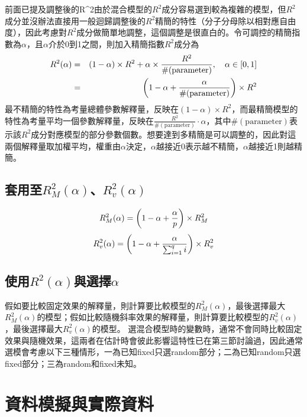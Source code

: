 前面已提及調整後的R^2由於混合模型的$R^2$成分容易選到較為複雜的模型，但$R^2$成分並沒辦法直接用一般迴歸調整後的$R^2$精簡的特性（分子分母除以相對應自由度），因此考慮對$R^2$成分做簡單地調整，這個調整是很直白的。令可調控的精簡指數為$\alpha$，且$\alpha$介於0到1之間，則加入精簡指數$R^2$成分為
\begin{eqnarray}\label{eq:r2alpha}
R^2(\alpha) &=& (1-\alpha)\times R^2+\alpha\times\frac{R^2}{\#(\text{parameter})}, \quad\alpha\in[0, 1] \\
            &=& \left(1-\alpha+\frac{\alpha}{\#(\text{parameter})}\right)\times R^2 \nonumber 
\end{eqnarray}
最不精簡的特性為考量總體參數解釋量，反映在$(1-\alpha)\times R^2$，而最精簡模型的特性為考量平均一個參數解釋量，反映在$\frac{R^2}{\#(\text{parameter})}\cdot\alpha$，其中$\#(\text{parameter})$表示該$R^2$成分對應模型的部分參數個數。想要達到多精簡是可以調整的，因此對這兩個解釋量取加權平均，權重由$\alpha$決定，$\alpha$越接近0表示越不精簡，$\alpha$越接近1則越精簡。

\subsection{套用至$R_M^2(\alpha)$、$R_v^2(\alpha)$}
\begin{equation}\label{eq:r2malpha}
R_M^2(\alpha)=\left(1-\alpha+\frac{\alpha}{p}\right)\times R_M^2
\end{equation}
\begin{equation}\label{eq:r2valpha}
R_v^2(\alpha)=\left(1-\alpha+\frac{\alpha}{\sum_{i=1}^q i}\right)\times R_v^2
\end{equation}
\subsection{使用$R^2(\alpha)$與選擇$\alpha$}
假如要比較固定效果的解釋量，則計算要比較模型的$R_M^2(\alpha)$，最後選擇最大$R_M^2(\alpha)$的模型；假如比較隨機斜率效果的解釋量，則計算要比較模型的$R_v^2(\alpha)$，最後選擇最大$R_v^2(\alpha)$的模型。
選混合模型時的變數時，通常不會同時比較固定效果與隨機效果，這兩者在估計時會彼此影響這特性已在第三節討論過，因此通常選模會考慮以下三種情形，一為已知fixed只選random部分；二為已知random只選fixed部分；三為random和fixed未知。

\newpage 
\section{資料模擬與實際資料}
